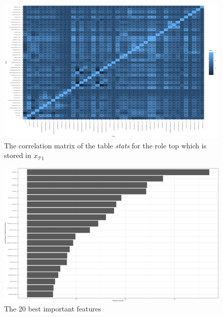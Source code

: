 \documentclass{article}
\begin{document}
\begin{figure}
    \includegraphics[scale=0.45]{cor2.png}
    \caption{The correlation matrix of the table \emph{stats} for the role top which is stored in $x_{\mathcal{T}1}$}
    \label{fig:cor2}
\end{figure}

\begin{figure}
    \includegraphics[scale=0.45]{importance.png}
    \caption{The 20 best important features}
    \label{fig:importance}
\end{figure}
\end{document}
